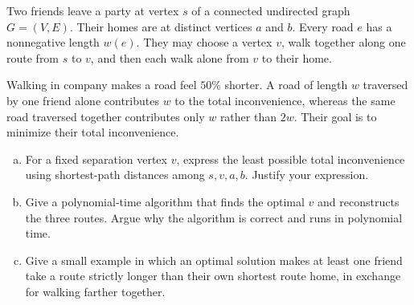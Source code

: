 \documentclass[11pt,a4paper]{article}
\begin{document}
\begin{assignment}
Two friends leave a party at vertex $s$ of a connected undirected graph
$G=(V,E)$.  Their homes are at distinct vertices $a$ and $b$.  Every road
$e$ has a nonnegative length $w(e)$.  They may choose a vertex $v$, walk
together along one route from $s$ to $v$, and then each walk alone from $v$
to their home.

Walking in company makes a road feel $50\%$ shorter.
A road of length $w$ traversed by one friend alone contributes $w$ to the total inconvenience, whereas the
same road traversed together contributes only $w$ rather than $2w$. 
Their goal is to minimize their total inconvenience.
\begin{enumerate}[(a)]
\item For a fixed separation vertex $v$, express the least possible total
inconvenience using shortest-path distances among $s,v,a,b$.  Justify your
expression.
\item Give a polynomial-time algorithm that finds the optimal $v$ and
reconstructs the three routes.
Argue why the algorithm is correct and runs in polynomial time.

\item Give a small example in which an optimal solution makes at least one
friend take a route strictly longer than their own shortest route home, in
exchange for walking farther together.
\end{enumerate}
\end{assignment}
\end{document}
